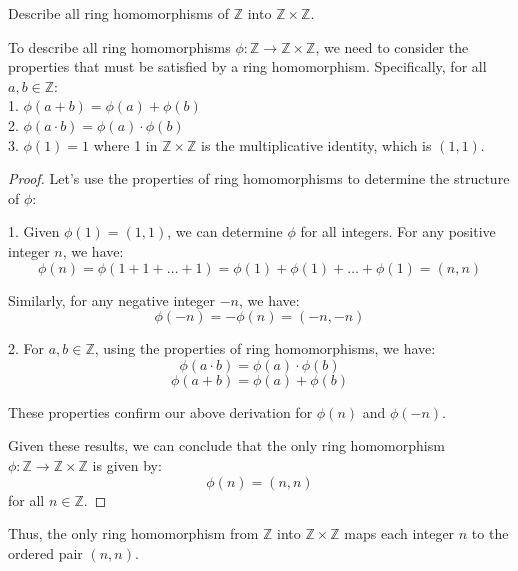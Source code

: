 \documentclass[12pt]{amsart}
\theoremstyle{definition}
\numberwithin{equation}{section}
\theoremstyle{plain}
\newcommand{\Z}{\mathbb{Z}}
\begin{document}
\begin{exercise}{24} 
    Describe all ring homomorphisms of $\Z$ into $\Z \times \Z$.

    To describe all ring homomorphisms \( \phi:\Z \to\Z \times\Z \), we need to consider the properties that must be satisfied by a ring homomorphism. Specifically, for all \( a, b \in\Z \):\\
1. \( \phi(a + b) = \phi(a) + \phi(b) \)\\
2. \( \phi(a \cdot b) = \phi(a) \cdot \phi(b) \)\\
3. \( \phi(1) = 1 \) where 1 in \(\Z \times\Z \) is the multiplicative identity, which is \( (1,1) \).\\

\begin{proof}
Let's use the properties of ring homomorphisms to determine the structure of \( \phi \):

1. Given \( \phi(1) = (1,1) \), we can determine \( \phi \) for all integers. For any positive integer \( n \), we have:
\[ \phi(n) = \phi(1 + 1 + \dots + 1) = \phi(1) + \phi(1) + \dots + \phi(1) = (n,n) \]

Similarly, for any negative integer \( -n \), we have:
\[ \phi(-n) = -\phi(n) = (-n,-n) \]

2. For \( a, b \in\Z \), using the properties of ring homomorphisms, we have:
\[ \phi(a \cdot b) = \phi(a) \cdot \phi(b) \]
\[ \phi(a + b) = \phi(a) + \phi(b) \]

These properties confirm our above derivation for \( \phi(n) \) and \( \phi(-n) \).

Given these results, we can conclude that the only ring homomorphism \( \phi:\Z \to\Z \times\Z \) is given by:
\[ \phi(n) = (n,n) \]
for all \( n \in\Z \).
\end{proof}

Thus, the only ring homomorphism from \(\Z \) into \(\Z \times\Z \) maps each integer \( n \) to the ordered pair \( (n,n) \).
\end{exercise}
\vspace*{20pt}
\end{document}
